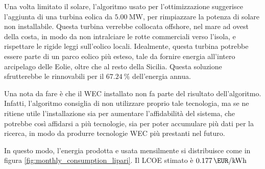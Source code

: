\documentclass[fleqn,11pt]{SelfArx} %
\begin{document}
Una volta limitato il solare, l'algoritmo usato per l'ottimizzazione suggerisce l'aggiunta di una turbina eolica da \(\SI{5.00}{\MW}\), per rimpiazzare la potenza di solare non installabile.
Questa turbina verrebbe collocata offshore, nel mare ad ovest della costa, in modo da non intralciare le rotte commerciali verso l'isola, e rispettare le rigide leggi sull'eolico locali.
Idealmente, questa turbina potrebbe essere parte di un parco eolico più esteso, tale da fornire energia all'intero arcipelago delle Eolie, oltre che al resto della Sicilia.
Questa soluzione sfrutterebbe le rinnovabili per il \(\SI{67.24}{\percent}\) dell'energia annua.

Una nota da fare è che il WEC installato non fa parte del risultato dell'algoritmo.
Infatti, l'algoritmo consiglia di non utilizzare proprio tale tecnologia, ma se ne ritiene utile l'installazione sia per aumentare l'affidabilità del sistema, che potrebbe così affidarsi a più tecnologie, sia per poter accumulare più dati per la ricerca, in modo da produrre tecnologie WEC più prestanti nel futuro.

In questo modo, l'energia prodotta e usata mensilmente si distribuisce come in figura \ref{fig:monthly_consumption_lipari}. Il LCOE stimato è \(\SI{0.177}{\EUR\per\kWh}\)
\end{document}
